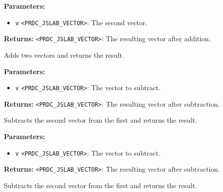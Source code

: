 \documentclass[12pt,a4paper]{article}
\begin{document}
\vspace{5mm}
\noindent {}


\noindent \textbf{Parameters:}
\begin{itemize}
  \item \texttt{v} \texttt{<PRDC\_JSLAB\_VECTOR>}: The second vector.
\end{itemize}

\noindent \textbf{Returns:} \texttt{<PRDC\_JSLAB\_VECTOR>}: The resulting vector after addition.

\noindent Adds two vectors and returns the result.

\vspace{5mm}
\noindent {}


\noindent \textbf{Parameters:}
\begin{itemize}
  \item \texttt{v} \texttt{<PRDC\_JSLAB\_VECTOR>}: The vector to subtract.
\end{itemize}

\noindent \textbf{Returns:} \texttt{<PRDC\_JSLAB\_VECTOR>}: The resulting vector after subtraction.

\noindent Subtracts the second vector from the first and returns the result.

\vspace{5mm}
\noindent {}


\noindent \textbf{Parameters:}
\begin{itemize}
  \item \texttt{v} \texttt{<PRDC\_JSLAB\_VECTOR>}: The vector to subtract.
\end{itemize}

\noindent \textbf{Returns:} \texttt{<PRDC\_JSLAB\_VECTOR>}: The resulting vector after subtraction.

\noindent Subtracts the second vector from the first and returns the result.

\vspace{5mm}
\noindent {}
\end{document}
